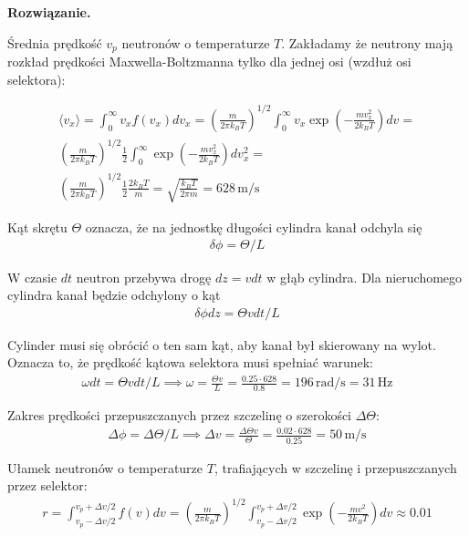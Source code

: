 \documentclass[11pt,a4paper]{article}
\newenvironment{solution}{\vspace{1cm} \par\textbf{Rozwiązanie.} \vspace{1cm}}{}
\begin{document}
\begin{solution}

Średnia prędkość $v_p$ neutronów o temperaturze $T$. Zakładamy że 
neutrony mają rozkład prędkości Maxwella-Boltzmanna tylko dla jednej osi 
(wzdłuż osi selektora):


\begin{align*}
  \langle v_x \rangle = \int_0^\infty v_x f(v_x) dv_x  = 
  \left( \frac{m}{2\pi k_B T} \right)^{1/2} 
  \int_0^\infty v_x \exp\left( -\frac{m v_x^2}{2 k_B T} \right) dv = \\
 \left( \frac{m}{2\pi k_B T} \right)^{1/2}  \frac{1}{2} \int_{0}^{\infty} \exp\left( -\frac{m v_x^2}{2 k_B T} \right) dv^{2}_x =\\
  \left( \frac{m}{2\pi k_B T} \right)^{1/2}  \frac{1}{2} \frac{2 k_B T}{m} = 
  \sqrt{\frac{k_B T}{2\pi m}} = 628\,\text{m/s} 
\end{align*}



Kąt skrętu $\Theta$ oznacza, że na jednostkę długości cylindra kanał odchyla się 
\begin{align*}
\delta \phi = \Theta / L
\end{align*} 

W czasie $dt$ neutron przebywa drogę $dz = v dt$ w głąb cylindra. 
Dla nieruchomego cylindra kanał będzie odchylony o kąt 
\begin{align*}
\delta \phi dz = \Theta v dt / L
\end{align*}

Cylinder musi się obrócić o ten sam kąt, aby kanał był skierowany na wylot. 
Oznacza to, że prędkość kątowa selektora musi spełniać warunek:
\begin{align*}
\omega dt = \Theta v dt / L \implies \omega = \frac{\Theta v}{L} 
= \frac{0.25 \cdot 628}{0.8} = 196\,\text{rad/s} = 31\,\text{Hz}
\end{align*}

Zakres prędkości przepuszczanych przez szczelinę o szerokości $\Delta\Theta$:
\begin{align*}
\Delta \phi = \Delta\Theta / L \implies \Delta v = \frac{\Delta\Theta v}{\Theta} = 
\frac{0.02 \cdot 628}{0.25} = 50\,\text{m/s}
\end{align*}

Ułamek neutronów o temperaturze $T$, trafiających w szczelinę
i przepuszczanych przez selektor:
\begin{align*}
r = \int_{v_p - \Delta v/2}^{v_p + \Delta v/2} f(v) dv = 
\left( \frac{m}{2\pi k_B T} \right)^{1/2} 
\int_{v_p - \Delta v/2}^{v_p + \Delta v/2} \exp\left( -\frac{m v^2}{2 k_B T} \right) dv \approx  
0.01
\end{align*}


\end{solution}
\end{document}
